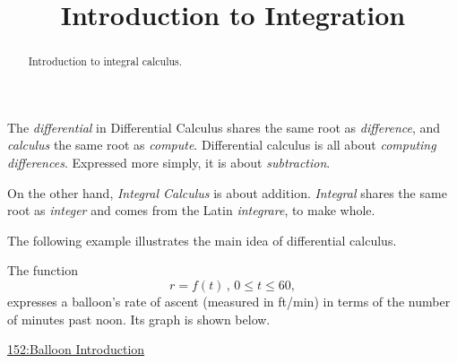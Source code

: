 \documentclass{ximera}
\title{Introduction to Integration}
\begin{document}
\begin{abstract}
Introduction to integral calculus.
\end{abstract}
\maketitle

The \emph{differential} in Differential Calculus shares the same root as \emph{difference}, and \emph{calculus} the same root as \emph{compute}. Differential calculus is all about \emph{computing differences}. Expressed more simply, it is about \emph{subtraction}.


On the other hand, \emph{Integral Calculus} is about addition. \emph{Integral} shares the same root as \emph{integer} and comes from the Latin \emph{integrare}, to make whole. 

The following example illustrates the main idea of differential calculus.

\begin{example}  \label{Ex:98dfrghha}

The function 
\[
    r = f(t) \, , \, 0\leq t \leq  60 , 
\]
expresses a balloon's rate of ascent (measured in ft/min) in terms of the number of minutes past noon. Its graph is shown below.

\begin{onlineOnly}
    \begin{center}
\end{center}
\end{onlineOnly}

\href{https://www.desmos.com/calculator/tgi5yiuzab}{152:Balloon Introduction}


\end{example}
\end{document}
